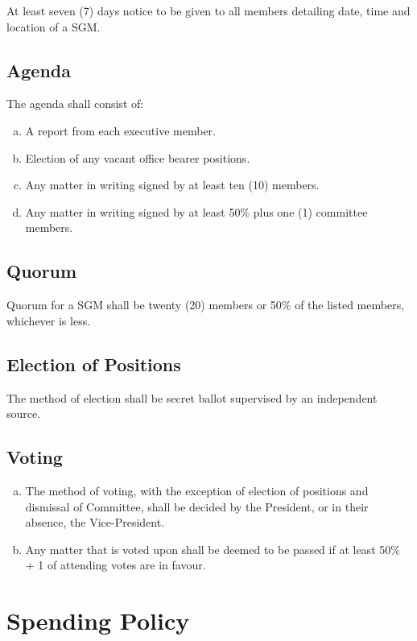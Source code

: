 \documentclass[a4paper,12pt]{article}
\begin{document}
At least seven (7) days notice to be given to all members detailing date, time and location of a SGM.

\subsection{Agenda}

The agenda shall consist of:

\begin{enumerate}[a)]
	\item A report from each executive member.
	\item Election of any vacant office bearer positions.
	\item Any matter in writing signed by at least ten (10) members.
	\item Any matter in writing signed by at least 50\% plus one (1) committee members.
\end{enumerate}

\subsection{Quorum}

Quorum for a SGM shall be twenty (20) members or 50\% of the listed members, whichever is less.

\subsection{Election of Positions}

The method of election shall be secret ballot supervised by an independent source.

\subsection{Voting}

\begin{enumerate}[a)]
	\item The method of voting, with the exception of election of positions and dismissal of Committee, shall be decided by the President, or in their absence, the Vice-President.
	\item Any matter that is voted upon shall be deemed to be passed if at least 50\% + 1 of attending votes are in favour.
\end{enumerate}

\section{Spending Policy}
\end{document}
